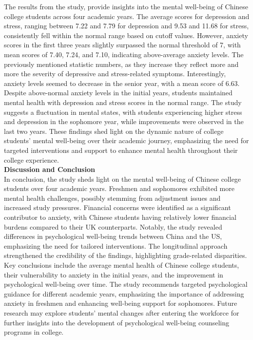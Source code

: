 \documentclass[11pt]{report}
\begin{document}
The results from the study, provide insights into the mental well-being of Chinese college students across four academic years. The average scores for depression and stress, ranging between 7.22 and 7.79 for depression and 9.53 and 11.68 for stress, consistently fell within the normal range based on cutoff values. However, anxiety scores in the first three years slightly surpassed the normal threshold of 7, with mean scores of 7.40, 7.24, and 7.10, indicating above-average anxiety levels. The previously mentioned statistic numbers, as they increase they reflect more and more the severity of depressive and stress-related symptoms. Interestingly, anxiety levels seemed to decrease in the senior year, with a mean score of 6.63. Despite above-normal anxiety levels in the initial years, students maintained mental health with depression and stress scores in the normal range. The study suggests a fluctuation in mental states, with students experiencing higher stress and depression in the sophomore year, while improvements were observed in the last two years. These findings shed light on the dynamic nature of college students' mental well-being over their academic journey, emphasizing the need for targeted interventions and support to enhance mental health throughout their college experience.\vspace{5mm} \\
\textbf{Discussion and Conclusion} \\
In conclusion, the study sheds light on the mental well-being of Chinese college students over four academic years. Freshmen and sophomores exhibited more mental health challenges, possibly stemming from adjustment issues and increased study pressures. Financial concerns were identified as a significant contributor to anxiety, with Chinese students having relatively lower financial burdens compared to their UK counterparts. Notably, the study revealed differences in psychological well-being trends between China and the US, emphasizing the need for tailored interventions. The longitudinal approach strengthened the credibility of the findings, highlighting grade-related disparities. Key conclusions include the average mental health of Chinese college students, their vulnerability to anxiety in the initial years, and the improvement in psychological well-being over time. The study recommends targeted psychological guidance for different academic years, emphasizing the importance of addressing anxiety in freshmen and enhancing well-being support for sophomores. Future research may explore students' mental changes after entering the workforce for further insights into the development of psychological well-being counseling programs in college.
\end{document}
